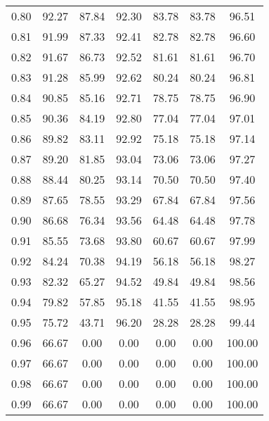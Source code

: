 \begin{tabular}{|c|c|c|c|c|c|c|}
      0.80 &     92.27 &     87.84 &      92.30 &   83.78 &      83.78 &         96.51 \\
      0.81 &     91.99 &     87.33 &      92.41 &   82.78 &      82.78 &         96.60 \\
      0.82 &     91.67 &     86.73 &      92.52 &   81.61 &      81.61 &         96.70 \\
      0.83 &     91.28 &     85.99 &      92.62 &   80.24 &      80.24 &         96.81 \\
      0.84 &     90.85 &     85.16 &      92.71 &   78.75 &      78.75 &         96.90 \\
      0.85 &     90.36 &     84.19 &      92.80 &   77.04 &      77.04 &         97.01 \\
      0.86 &     89.82 &     83.11 &      92.92 &   75.18 &      75.18 &         97.14 \\
      0.87 &     89.20 &     81.85 &      93.04 &   73.06 &      73.06 &         97.27 \\
      0.88 &     88.44 &     80.25 &      93.14 &   70.50 &      70.50 &         97.40 \\
      0.89 &     87.65 &     78.55 &      93.29 &   67.84 &      67.84 &         97.56 \\
      0.90 &     86.68 &     76.34 &      93.56 &   64.48 &      64.48 &         97.78 \\
      0.91 &     85.55 &     73.68 &      93.80 &   60.67 &      60.67 &         97.99 \\
      0.92 &     84.24 &     70.38 &      94.19 &   56.18 &      56.18 &         98.27 \\
      0.93 &     82.32 &     65.27 &      94.52 &   49.84 &      49.84 &         98.56 \\
      0.94 &     79.82 &     57.85 &      95.18 &   41.55 &      41.55 &         98.95 \\
      0.95 &     75.72 &     43.71 &      96.20 &   28.28 &      28.28 &         99.44 \\
      0.96 &     66.67 &      0.00 &       0.00 &    0.00 &       0.00 &        100.00 \\
      0.97 &     66.67 &      0.00 &       0.00 &    0.00 &       0.00 &        100.00 \\
      0.98 &     66.67 &      0.00 &       0.00 &    0.00 &       0.00 &        100.00 \\
      0.99 &     66.67 &      0.00 &       0.00 &    0.00 &       0.00 &        100.00 \\
\bottomrule
\end{tabular}
